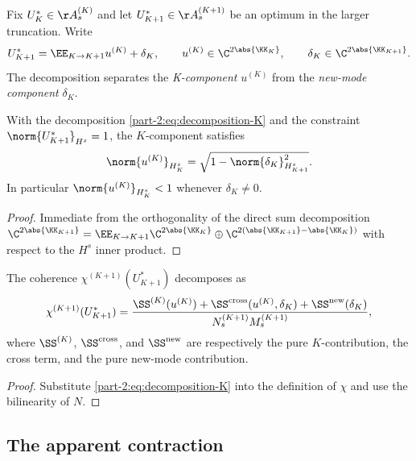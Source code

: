 Fix $U^\ast_K\in\AA_s^{(K)}$ and let 
$U^\ast_{K+1}\in\AA_s^{(K+1)}$ be an optimum in the larger truncation. 
Write
\begin{equation}\label{part-2:eq:decomposition-K}
U^\ast_{K+1} = \EE_{K\to K+1} u^{(K)} + \delta_K,
\qquad
u^{(K)}\in\C^{2\abs{\KK_K}},
\qquad
\delta_K\in\C^{2\abs{\KK_{K+1}}}.
\end{equation}
The decomposition separates the \emph{K-component} $u^{(K)}$ from the 
\emph{new-mode component} $\delta_K$.

\begin{proposition}\label{part-2:prop:norm-loss}
With the decomposition \eqref{part-2:eq:decomposition-K} and the constraint 
$\norm{U^\ast_{K+1}}_{H^s}=1$, the $K$-component satisfies
\begin{equation}\label{part-2:eq:norm-K-comp}
\norm{u^{(K)}}_{H^s_K} = \sqrt{1 - \norm{\delta_K}_{H^s_{K+1}}^2}.
\end{equation}
In particular $\norm{u^{(K)}}_{H^s_K}<1$ whenever $\delta_K\neq 0$.
\end{proposition}

\begin{proof}
Immediate from the orthogonality of the direct sum decomposition 
$\C^{2\abs{\KK_{K+1}}} = \EE_{K\to K+1}\C^{2\abs{\KK_K}}\oplus 
\C^{2(\abs{\KK_{K+1}}-\abs{\KK_K})}$ with respect to the $H^s$ 
inner product.
\end{proof}

\begin{proposition}\label{part-2:prop:three-cont}
The coherence $\chi^{(K+1)}(U^\ast_{K+1})$ decomposes as
\begin{equation}\label{part-2:eq:chi-decomp}
\chi^{(K+1)}(U^\ast_{K+1}) 
= \frac{\SS^{(K)}(u^{(K)}) + \SS^{\mathrm{cross}}(u^{(K)},\delta_K) + \SS^{\mathrm{new}}(\delta_K)}
       {N_s^{(K+1)} M_s^{(K+1)}},
\end{equation}
where $\SS^{(K)}$, $\SS^{\mathrm{cross}}$, and $\SS^{\mathrm{new}}$ are 
respectively the pure $K$-contribution, the cross term, and the pure 
new-mode contribution.
\end{proposition}

\begin{proof}
Substitute \eqref{part-2:eq:decomposition-K} into the definition of $\chi$ 
and use the bilinearity of $N$.
\end{proof}

\subsection{The apparent contraction}
\label{part-2:ssec:apparent-contraction}

